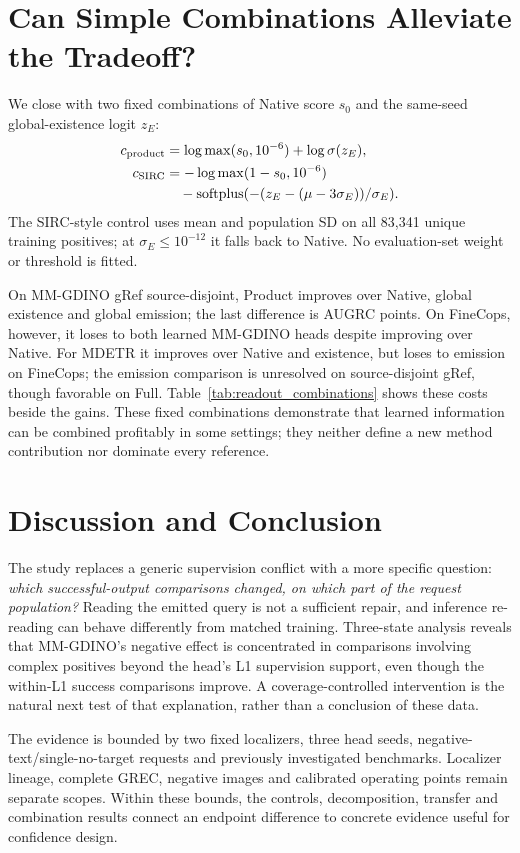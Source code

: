 \documentclass[10pt,twocolumn,letterpaper]{article}
\begin{document}
\section{Can Simple Combinations Alleviate the Tradeoff?}
We close with two fixed combinations of Native score $s_0$ and the
same-seed global-existence logit $z_E$:
\begin{align}
c_{\rm product}&=\log\max(s_0,10^{-6})+\log\sigma(z_E),\\
c_{\rm SIRC}&=-\log\max(1-s_0,10^{-6})\nonumber\\
&\quad-\operatorname{softplus}(-(z_E-(\mu-3\sigma_E))/\sigma_E).
\end{align}
The SIRC-style control \cite{xia2024sirc} uses mean and population SD
on all 83,341 unique training positives; at $\sigma_E\leq10^{-12}$
it falls back to Native. No evaluation-set weight or threshold is fitted.

On MM-GDINO gRef source-disjoint, Product improves over Native,
global existence and global emission; the last difference is
\MMTransferProduct{} AUGRC points. On FineCops, however, it loses
to both learned MM-GDINO heads despite improving over Native.
For MDETR it improves over Native and existence, but loses to emission
on FineCops; the emission comparison is unresolved on source-disjoint
gRef, though favorable on Full. Table~\ref{tab:readout_combinations}
shows these costs beside the gains. These fixed combinations demonstrate
that learned information can be combined profitably in some settings;
they neither define a new method contribution nor dominate every reference.

\section{Discussion and Conclusion}
The study replaces a generic supervision conflict with a more specific
question: \emph{which successful-output comparisons changed, on which
part of the request population?} Reading the emitted query is not a
sufficient repair, and inference re-reading can behave differently from
matched training. Three-state analysis reveals that MM-GDINO's negative
effect is concentrated in comparisons involving complex positives beyond
the head's L1 supervision support, even though the within-L1 success
comparisons improve. A coverage-controlled intervention is the natural
next test of that explanation, rather than a conclusion of these data.

The evidence is bounded by two fixed localizers, three head seeds,
negative-text/single-no-target requests and previously investigated
benchmarks. Localizer lineage, complete GREC, negative images and
calibrated operating points remain separate scopes. Within these bounds,
the controls, decomposition, transfer and combination results connect
an endpoint difference to concrete evidence useful for confidence design.

\FloatBarrier
{\small}
\end{document}
